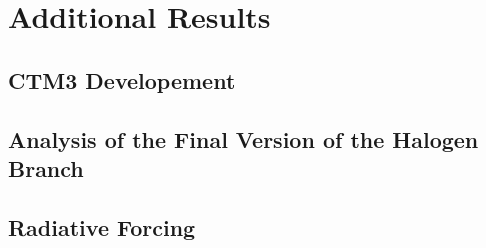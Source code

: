 \chapter{Additional Results}\label{chap:add_res}

\section{CTM3 Developement}\label{app:CTM3_dev}















%


%



%


\clearpage
\section{Analysis of the Final Version of the Halogen Branch}\label{app:final_version}











\clearpage
\section{Radiative Forcing}\label{app:RF}








